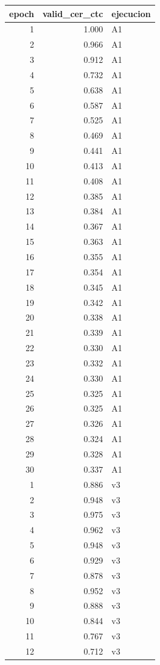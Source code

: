 \begin{tabular}{rrl}
\toprule
epoch & valid_cer_ctc & ejecucion \\
\midrule
1 & 1.000 & A1 \\
2 & 0.966 & A1 \\
3 & 0.912 & A1 \\
4 & 0.732 & A1 \\
5 & 0.638 & A1 \\
6 & 0.587 & A1 \\
7 & 0.525 & A1 \\
8 & 0.469 & A1 \\
9 & 0.441 & A1 \\
10 & 0.413 & A1 \\
11 & 0.408 & A1 \\
12 & 0.385 & A1 \\
13 & 0.384 & A1 \\
14 & 0.367 & A1 \\
15 & 0.363 & A1 \\
16 & 0.355 & A1 \\
17 & 0.354 & A1 \\
18 & 0.345 & A1 \\
19 & 0.342 & A1 \\
20 & 0.338 & A1 \\
21 & 0.339 & A1 \\
22 & 0.330 & A1 \\
23 & 0.332 & A1 \\
24 & 0.330 & A1 \\
25 & 0.325 & A1 \\
26 & 0.325 & A1 \\
27 & 0.326 & A1 \\
28 & 0.324 & A1 \\
29 & 0.328 & A1 \\
30 & 0.337 & A1 \\
1 & 0.886 & v3 \\
2 & 0.948 & v3 \\
3 & 0.975 & v3 \\
4 & 0.962 & v3 \\
5 & 0.948 & v3 \\
6 & 0.929 & v3 \\
7 & 0.878 & v3 \\
8 & 0.952 & v3 \\
9 & 0.888 & v3 \\
10 & 0.844 & v3 \\
11 & 0.767 & v3 \\
12 & 0.712 & v3 \\

\end{tabular}
